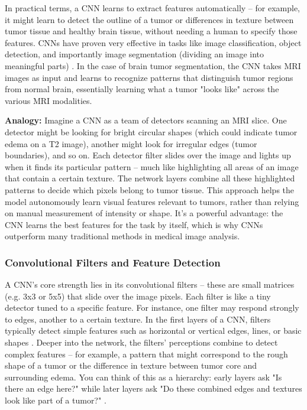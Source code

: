 In practical terms, a CNN learns to extract features automatically – for example, it might learn to detect the outline of a tumor or differences in texture between tumor tissue and healthy brain tissue, without needing a human to specify those features. CNNs have proven very effective in tasks like image classification, object detection, and importantly image segmentation (dividing an image into meaningful parts) \cite{datacamp2023cnn}. In the case of brain tumor segmentation, the CNN takes MRI images as input and learns to recognize patterns that distinguish tumor regions from normal brain, essentially learning what a tumor "looks like" across the various MRI modalities.

\textbf{Analogy:} Imagine a CNN as a team of detectors scanning an MRI slice. One detector might be looking for bright circular shapes (which could indicate tumor edema on a T2 image), another might look for irregular edges (tumor boundaries), and so on. Each detector filter slides over the image and lights up when it finds its particular pattern – much like highlighting all areas of an image that contain a certain texture. The network layers combine all these highlighted patterns to decide which pixels belong to tumor tissue. This approach helps the model autonomously learn visual features relevant to tumors, rather than relying on manual measurement of intensity or shape. It's a powerful advantage: the CNN learns the best features for the task by itself, which is why CNNs outperform many traditional methods in medical image analysis.

\subsubsection{Convolutional Filters and Feature Detection}
\label{sec:conv_filters}

A CNN's core strength lies in its convolutional filters – these are small matrices (e.g. 3x3 or 5x5) that slide over the image pixels. Each filter is like a tiny detector tuned to a specific feature. For instance, one filter may respond strongly to edges, another to a certain texture. In the first layers of a CNN, filters typically detect simple features such as horizontal or vertical edges, lines, or basic shapes \cite{medium2022cnn}. Deeper into the network, the filters' perceptions combine to detect complex features – for example, a pattern that might correspond to the rough shape of a tumor or the difference in texture between tumor core and surrounding edema. You can think of this as a hierarchy: early layers ask "Is there an edge here?" while later layers ask "Do these combined edges and textures look like part of a tumor?" \cite{datacamp2023cnn}.

